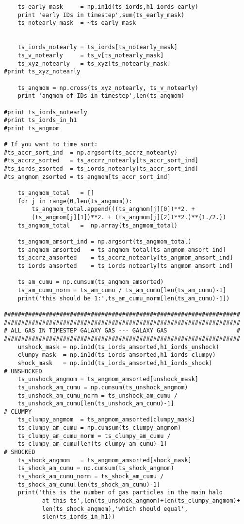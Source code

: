 \documentclass[12pt,headA,chapB]{fiskthesis}
\begin{document}
\begin{verbatim}
    ts_early_mask     = np.in1d(ts_iords,h1_iords_early)
    print 'early IDs in timestep',sum(ts_early_mask)
    ts_notearly_mask  = ~ts_early_mask


    ts_iords_notearly = ts_iords[ts_notearly_mask]
    ts_v_notearly     = ts_v[ts_notearly_mask]
    ts_xyz_notearly   = ts_xyz[ts_notearly_mask]
#print ts_xyz_notearly

    ts_angmom = np.cross(ts_xyz_notearly, ts_v_notearly)
    print 'angmom of IDs in timestep',len(ts_angmom)

#print ts_iords_notearly
#print ts_iords_in_h1
#print ts_angmom

# If you want to time sort:
#ts_accr_sort_ind  = np.argsort(ts_accrz_notearly)
#ts_accrz_sorted   = ts_accrz_notearly[ts_accr_sort_ind]
#ts_iords_zsorted  = ts_iords_notearly[ts_accr_sort_ind]
#ts_angmom_zsorted = ts_angmom[ts_accr_sort_ind]

    ts_angmom_total   = []
    for j in range(0,len(ts_angmom)):
        ts_angmom_total.append(((ts_angmom[j][0])**2. + 
        (ts_angmom[j][1])**2. + (ts_angmom[j][2])**2.)**(1./2.))
    ts_angmom_total   =  np.array(ts_angmom_total)

    ts_angmom_amsort_ind = np.argsort(ts_angmom_total)
    ts_angmom_amsorted   = ts_angmom_total[ts_angmom_amsort_ind]
    ts_accrz_amsorted    = ts_accrz_notearly[ts_angmom_amsort_ind]
    ts_iords_amsorted    = ts_iords_notearly[ts_angmom_amsort_ind]

    ts_am_cumu = np.cumsum(ts_angmom_amsorted)
    ts_am_cumu_norm = ts_am_cumu / ts_am_cumu[len(ts_am_cumu)-1]
    print('this should be 1:',ts_am_cumu_norm[len(ts_am_cumu)-1])

####################################################################
####################################################################
# ALL GAS IN TIMESTEP GALAXY GAS --- GALAXY GAS                    #
####################################################################
    unshock_mask = np.in1d(ts_iords_amsorted,h1_iords_unshock)
    clumpy_mask  = np.in1d(ts_iords_amsorted,h1_iords_clumpy)
    shock_mask   = np.in1d(ts_iords_amsorted,h1_iords_shock)
# UNSHOCKED
    ts_unshock_angmom = ts_angmom_amsorted[unshock_mask]
    ts_unshock_am_cumu = np.cumsum(ts_unshock_angmom)
    ts_unshock_am_cumu_norm = ts_unshock_am_cumu / 
    ts_unshock_am_cumu[len(ts_unshock_am_cumu)-1]
# CLUMPY
    ts_clumpy_angmom  = ts_angmom_amsorted[clumpy_mask]
    ts_clumpy_am_cumu = np.cumsum(ts_clumpy_angmom)
    ts_clumpy_am_cumu_norm = ts_clumpy_am_cumu / 
    ts_clumpy_am_cumu[len(ts_clumpy_am_cumu)-1]
# SHOCKED
    ts_shock_angmom   = ts_angmom_amsorted[shock_mask]
    ts_shock_am_cumu = np.cumsum(ts_shock_angmom)
    ts_shock_am_cumu_norm = ts_shock_am_cumu / 
    ts_shock_am_cumu[len(ts_shock_am_cumu)-1]
    print('this is the number of gas particles in the main halo 
           at this ts',len(ts_unshock_angmom)+len(ts_clumpy_angmom)+
           len(ts_shock_angmom),'which should equal',
           slen(ts_iords_in_h1))


\end{verbatim}
\end{document}
